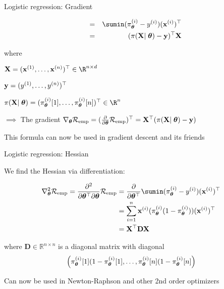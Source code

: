 \documentclass[11pt,compress,t,notes=noshow, xcolor=table]{beamer}
\begin{document}
\begin{frame}{Logistic regression: Gradient}

\begin{align*}
\quad &=& 
\sumin ( \pi^{(i)}_{\thetav}  - \yi)(\xi)^\top\\
\quad &=& 
(\pi(\mathbf{X}\vert\;\thetav) - \mathbf{y})^\top\mathbf{X}\\
\end{align*}

where

\begin{itemizeM}
\item $\mathbf{X} = (
\xi[1], \dots, 
\xi[n])^\top \in \R^{n\times d}$
\item $\mathbf{y} = (
\yi[1], \dots,\yi[n])^\top$
\item $\pi(\mathbf{X}\vert\;\thetav) = (
 \pi^{(i)}_{\thetav} [1], \dots,
\pi^{(i)}_{\thetav}[n]
)^\top \in \R^{n}$
\end{itemizeM}

\vfill

$\implies$ The gradient $\nabla_{\thetav}\riske = (\frac{\partial}{\partial\thetav}\riske)^\top =  \mathbf{X}^\top(\pi(\mathbf{X}\vert\;\thetav) - \mathbf{y})$ 

\vfill

This formula can now be used in gradient descent and its friends

\end{frame}


\begin{frame}{Logistic regression: Hessian}

We find the Hessian via differentiation:

{\small
\begin{align*}
\nabla^2_{\thetav}\riske  = \frac{\partial^2}{\partial{\thetav^\top}\partial\thetav}\riske  & =  
\frac{\partial}{\partial{\thetav^\top}} \sumin ( \pi^{(i)}_{\thetav} - \yi)(\xi)^\top\\
& =  
\sum^n_{i=1}\xi ( \pi^{(i)}_{\thetav}(1- \pi^{(i)}_{\thetav}))(\xi)^\top\\
& =  
\mathbf{X}^\top \mathbf{D} \mathbf{X}\\
\end{align*}

where $\mathbf{D} \in \mathbb{R}^{n\times n}$ is a diagonal matrix with diagonal 
$$\Big( \pi^{(i)}_{\thetav}[1](1- \pi^{(i)}_{\thetav}[1], \dots,  \pi^{(i)}_{\thetav}[n](1- \pi^{(i)}_{\thetav}[n]\Big)$$
}

Can now be used in Newton-Raphson and other 2nd order optimizers


\end{frame}
\end{document}
